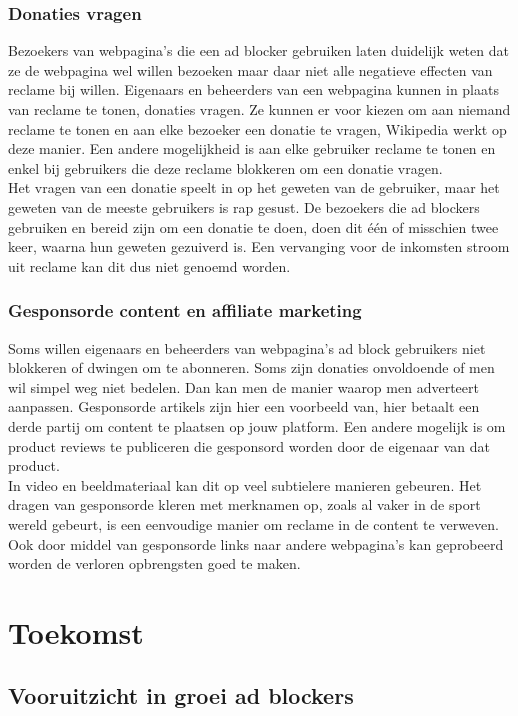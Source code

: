 \documentclass[pdftex,a4paper,12pt,twoside]{report}
\begin{document}
\subsection{Donaties vragen}
\label{sec Donaties vragen}
Bezoekers van webpagina's die een ad blocker gebruiken laten duidelijk weten dat ze de webpagina wel willen bezoeken maar daar niet alle negatieve effecten van reclame bij willen. Eigenaars en beheerders van een webpagina kunnen in plaats van reclame te tonen, donaties vragen. Ze kunnen er voor kiezen om aan niemand reclame te tonen en aan elke bezoeker een donatie te vragen, Wikipedia werkt op deze manier. Een andere mogelijkheid is aan elke gebruiker reclame te tonen en enkel bij gebruikers die deze reclame blokkeren om een donatie vragen.
\\
Het vragen van een donatie speelt in op het geweten van de gebruiker, maar het geweten van de meeste gebruikers is rap gesust. De bezoekers die ad blockers gebruiken en bereid zijn om een donatie te doen, doen dit één of misschien twee keer, waarna hun geweten gezuiverd is. Een vervanging voor de inkomsten stroom uit reclame kan dit dus niet genoemd worden.


\subsection{Gesponsorde content en affiliate marketing}
\label{sec Gesponsorde content en affiliate marketing}
Soms willen eigenaars en beheerders van webpagina's ad block gebruikers niet blokkeren of dwingen om te abonneren. Soms zijn donaties onvoldoende of men wil simpel weg niet bedelen. Dan kan men de manier waarop men adverteert aanpassen. Gesponsorde artikels zijn hier een voorbeeld van, hier betaalt een derde partij om content te plaatsen op jouw platform. Een andere mogelijk is om product reviews te publiceren die gesponsord worden door de eigenaar van dat product. 
\\
In video en beeldmateriaal kan dit op veel subtielere manieren gebeuren. Het dragen van gesponsorde kleren met merknamen op, zoals al vaker in de sport wereld gebeurt, is een eenvoudige manier om reclame in de content te verweven.
\\
Ook door middel van gesponsorde links naar andere webpagina's kan geprobeerd worden de verloren opbrengsten goed te maken.
\chapter{Toekomst}
\label{ch:Toekomst}
\section{Vooruitzicht in groei ad blockers}
\label{ch:Vooruitzicht in groei}
\end{document}
